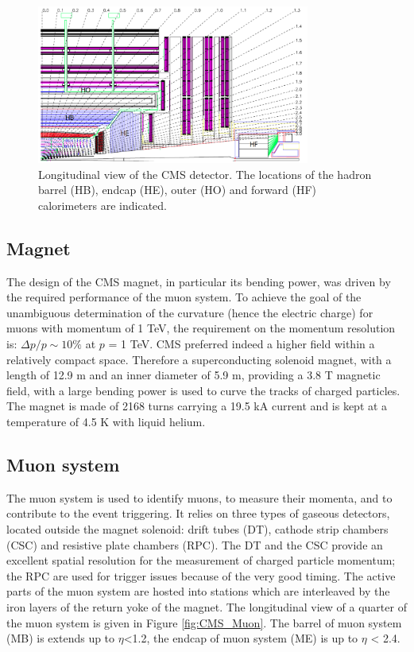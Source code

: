\begin{figure}[h!]
\begin{center}
\includegraphics[width=0.8\textwidth]{figures/CMS/HCAL/HCAL.png}
\caption{Longitudinal view of the CMS detector. The locations of the hadron barrel (HB), endcap (HE), outer (HO) and forward (HF) calorimeters are indicated.}
\label{fig:CMS_HCAL}
\end{center}
\end{figure}


\subsection{Magnet}\label{subsec:CMS_Magnet}
The design of the CMS magnet, in particular its bending power, was driven by the required performance of the muon system. To achieve the goal of the unambiguous determination
of the curvature (hence the electric charge) for muons with momentum of 1 TeV, the requirement on the momentum resolution is: $\Delta p/p\sim10\%$ at $p$ = 1 TeV. CMS preferred indeed a higher field within a relatively compact space. Therefore a superconducting solenoid magnet, with a length of 12.9 m and an inner diameter of 5.9 m, providing a 3.8 T magnetic field, with a large bending power is used to curve the tracks of charged particles. The magnet is made of 2168 turns carrying a 19.5 kA current and is kept at a temperature of 4.5 K with liquid helium.

\subsection{Muon system}\label{subsec:CMS_muon}
The muon system is used to identify muons, to measure their momenta, and to contribute to the event triggering. It relies on three types of gaseous detectors, located outside the
magnet solenoid: drift tubes (DT), cathode strip chambers (CSC) and resistive plate chambers (RPC). The DT and the CSC provide an excellent spatial resolution for the measurement of charged particle momentum; the RPC are used for trigger issues because of the very good timing. The active parts of the muon system are hosted into stations which are interleaved by the iron layers of the return yoke of the magnet. The longitudinal view of a quarter of the muon system is given in Figure \ref{fig:CMS_Muon}. The barrel of muon system (MB) is extends up to $\eta$<1.2, the endcap of muon system (ME) is up to $\eta$ < 2.4.

